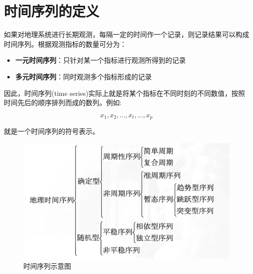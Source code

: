 









\section{时间序列的定义}

如果对地理系统进行长期观测，每隔一定的时间作一个记录，则记录结果可以构成时间序列。根据观测指标的数量可分为：

\begin{itemize}
    \item \textbf{一元时间序列}：只针对某一个指标进行观测所得到的记录
    \item \textbf{多元时间序列}：同时观测多个指标形成的记录
\end{itemize}

因此，时间序列(time series)实际上就是将某个指标在不同时刻的不同数值，按照时间先后的顺序排列而成的数列。例如:

\[x_1, x_2, \ldots, x_t, \ldots, x_p\]

就是一个时间序列的符号表示。

\begin{figure}[htbp]
    \centering
    \includegraphics{figure/地理时间序列的分类与构成.png}
    \caption{时间序列示意图}
    \label{fig:timeseries}
\end{figure}



